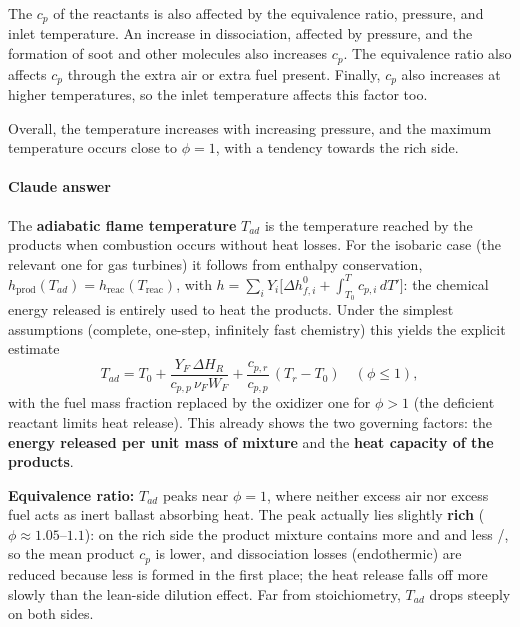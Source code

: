 The $c_p$ of the reactants is also affected by the equivalence ratio, pressure, and inlet temperature. An increase in dissociation, affected by pressure, and the formation of soot and other molecules also increases $c_p$. The equivalence ratio also affects $c_p$ through the extra air or extra fuel present. Finally, $c_p$ also increases at higher temperatures, so the inlet temperature affects this factor too.

Overall, the temperature increases with increasing pressure, and the maximum temperature occurs close to $\phi = 1$, with a tendency towards the rich side.

{\color{istblue}
\paragraph{Claude answer}
The \textbf{adiabatic flame temperature} $T_{ad}$ is the temperature reached by the products when combustion occurs without heat losses. For the isobaric case (the relevant one for gas turbines) it follows from enthalpy conservation, $h_{\mathrm{prod}}(T_{ad}) = h_{\mathrm{reac}}(T_{\mathrm{reac}})$, with $h = \sum_i Y_i \big[\Delta h_{f,i}^0 + \int_{T_0}^{T} c_{p,i}\,dT'\big]$: the chemical energy released is entirely used to heat the products. Under the simplest assumptions (complete, one-step, infinitely fast chemistry) this yields the explicit estimate~\cite{lecture2}
\begin{equation*}
T_{ad} = T_0 + \frac{Y_{F}\,\Delta H_R}{c_{p,p}\,\nu_F W_F} + \frac{c_{p,r}}{c_{p,p}}\,(T_r - T_0) \quad (\phi \le 1),
\end{equation*}
with the fuel mass fraction replaced by the oxidizer one for $\phi > 1$ (the deficient reactant limits heat release). This already shows the two governing factors: the \textbf{energy released per unit mass of mixture} and the \textbf{heat capacity of the products}.

\textbf{Equivalence ratio:} $T_{ad}$ peaks near $\phi = 1$, where neither excess air nor excess fuel acts as inert ballast absorbing heat. The peak actually lies slightly \textbf{rich} ($\phi \approx 1.05$--$1.1$): on the rich side the product mixture contains more  and  and less /, so the mean product $c_p$ is lower, and dissociation losses (endothermic) are reduced because less  is formed in the first place; the heat release falls off more slowly than the lean-side dilution effect. Far from stoichiometry, $T_{ad}$ drops steeply on both sides.

}
